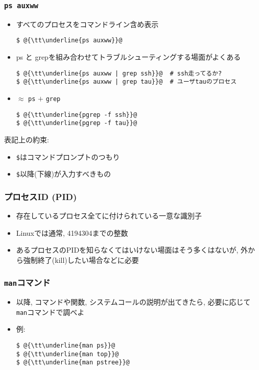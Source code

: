 \documentclass[12pt,dvipdfmx]{beamer}
\begin{document}
\begin{frame}[fragile]
  \frametitle{{\tt ps auxww}}
  \begin{itemize}
  \item すべてのプロセスをコマンドライン含め表示
\begin{lstlisting}
$ @{\tt\underline{ps auxww}}@
\end{lstlisting}%
\item ps と grepを組み合わせてトラブルシューティングする場面がよくある
\begin{lstlisting}
$ @{\tt\underline{ps auxww | grep ssh}}@  # ssh走ってるか?
$ @{\tt\underline{ps auxww | grep tau}}@  # ユーザtauのプロセス
\end{lstlisting}
\item {} $\approx$ {\tt ps} $+$ {\tt grep}
\begin{lstlisting}
$ @{\tt\underline{pgrep -f ssh}}@
$ @{\tt\underline{pgrep -f tau}}@
\end{lstlisting}
\end{itemize}

表記上の約束: 
\begin{itemize}
\item {\tt \$}はコマンドプロンプトのつもり
\item {\tt \$}以降(下線)が入力すべきもの
\end{itemize}
\end{frame}

\begin{frame}[fragile]
  \frametitle{プロセスID (PID)}
  \begin{itemize}
  \item 存在しているプロセス全てに付けられている一意な識別子
  \item Linuxでは通常, 4194304までの整数
  \item あるプロセスのPIDを知らなくてはいけない場面はそう多くはないが,
    外から強制終了(kill)したい場合などに必要
  \end{itemize}
\end{frame}

\begin{frame}[fragile]
  \frametitle{{\tt man}コマンド}
  \begin{itemize}
  \item 以降, コマンドや関数, システムコールの説明が出てきたら,
    必要に応じて{\tt man}コマンドで調べよ
  \item 例:
\begin{lstlisting}
$ @{\tt\underline{man ps}}@
$ @{\tt\underline{man top}}@
$ @{\tt\underline{man pstree}}@
\end{lstlisting} %
  \end{itemize}
\end{frame}
\end{document}
